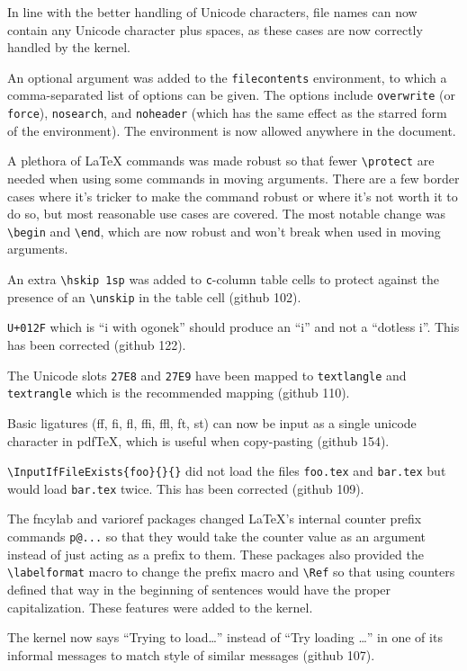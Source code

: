 \documentclass{ltxguide}
\newcommand\ghissue[1]{github #1}
\newcommand\ghissue[1]{%
    \href{https://github.com/latex3/latex2e/issues/#1}{github #1}}
\begin{document}
In line with the better handling of Unicode characters, file names
can now contain any Unicode character plus spaces, as these cases
are now correctly handled by the kernel.

An optional argument was added to the \texttt{filecontents} environment,
to which a comma-separated list of options can be given. The options
include \texttt{overwrite} (or \texttt{force}), \texttt{nosearch}, and
\texttt{noheader} (which has the same effect as the starred form of the
environment). The environment is now allowed anywhere in the document.

A plethora of \LaTeX{} commands was made robust so that fewer
\verb|\protect| are needed when using some commands in moving arguments.
There are a few border cases where it's tricker to make the command
robust or where it's not worth it to do so, but most reasonable use
cases are covered. The most notable change was \verb|\begin| and
\verb|\end|, which are now robust and won't break when used in moving
arguments.

An extra \verb|\hskip 1sp| was added to \verb|c|-column table cells to
protect against the presence of an \verb|\unskip| in the table cell
(\ghissue{102}).

\texttt{U+012F} which is ``i with ogonek'' should produce an
``i'' and not a ``dotless i''. This has been corrected
(\ghissue{122}).

The Unicode slots \texttt{27E8} and \texttt{27E9} have been mapped to
\verb|textlangle| and \verb|textrangle| which is the recommended mapping
(\ghissue{110}).

Basic ligatures (ff, fi, fl, ffi, ffl, ft, st) can now be input as a
single unicode character in pdf\TeX, which is useful when copy-pasting
(\ghissue{154}).

\verb|\InputIfFileExists{foo}{}{}|
did not load the files \texttt{foo.tex} and \texttt{bar.tex} but
would load \texttt{bar.tex} twice. This has been corrected (\ghissue{109}).

The \textsf{fncylab} and \textsf{varioref} packages changed \LaTeX's internal
counter prefix commands \verb|p@...| so that they would take the counter
value as an argument instead of just acting as a prefix to them. These
packages also provided the \verb|\labelformat| macro to change the prefix
macro and \verb|\Ref| so that using counters defined that way in the
beginning of sentences would have the proper capitalization. These features
were added to the \LaTeXe{} kernel.

The kernel now says ``Trying to load\ldots''
instead of ``Try loading \ldots'' in one of its informal
messages to match style of similar messages (\ghissue{107}).
\end{document}

